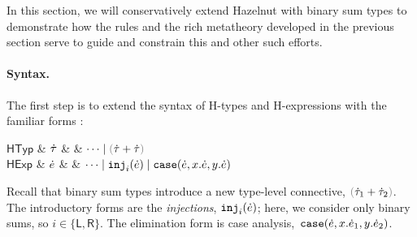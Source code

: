 \renewcommand{\thesumtypedef}{\theequation\alph{sumtypedef}}

\newcommand{\Define}[1]{(\refstepcounter{sumtypedef}\thesumtypedef\label{#1})}

In this section, we will conservatively extend Hazelnut with binary {sum
types} to demonstrate how the rules and the rich metatheory developed in
the previous section serve to guide and constrain this and other such
efforts.

\paragraph{Syntax.}
%
The first step is to extend the syntax of H-types and H-expressions
with the familiar forms \cite{pfpl}:\vspace{-2px}
\begin{grammar}
$\mathsf{HTyp}$ & $\dot{\tau}$ & \bnfas & $\cdots \bnfalt \tsum{\htau}{\htau}$
\\
$\mathsf{HExp}$ & $\dot{e}$ & \bnfas & $\cdots
\mathrel{\mid} \mathtt{inj}_{i}({\dot{e}})
\mathrel{\mid} \mathtt{case}({\dot{e}},{x}.{\dot{e}},{y}.{\dot{e}})$
\end{grammar}\vspace{-2px}
Recall that binary sum types introduce a new type-level connective,
$\tsum{\htau_1}{\htau_2}$. The introductory forms are the \emph{injections},
$\mathtt{inj}_{i}({\dot{e}})$; here, we consider only binary sums, so $i\in\{\mathsf{L}, \mathsf{R}\}$.
The elimination form is case
analysis,~$\mathtt{case}({\dot{e}},{x}.{\dot{e}_1},{y}.{\dot{e}_2})$.

